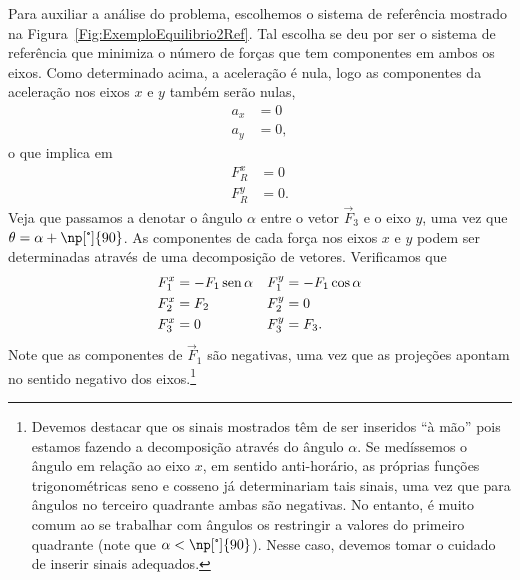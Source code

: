 Para auxiliar a análise do problema, escolhemos o sistema de referência mostrado na Figura~\ref{Fig:ExemploEquilibrio2Ref}. Tal escolha se deu por ser o sistema de referência que minimiza o número de forças que tem componentes em ambos os eixos. Como determinado acima, a aceleração é nula, logo as componentes da aceleração nos eixos $x$ e $y$ também serão nulas,
\begin{align}
    a_x &= 0 \\
    a_y &= 0,
\end{align}
%
o que implica em
\begin{align}
    F_R^x &= 0 \\
    F_R^y &= 0.
\end{align}
%
Veja que passamos a denotar o ângulo $\alpha$ entre o vetor $\vec{F}_3$ e o eixo $y$, uma vez que $\theta = \alpha + \np[\tcdegree]{90}$. As componentes de cada força nos eixos $x$ e $y$ podem ser determinadas através de uma decomposição de vetores. Verificamos que
\begin{align*}
    F_1^x &= -F_1\operatorname{sen}\alpha & F_1^y &= -F_1 \cos\alpha \\
    F_2^x &= F_2 & F_2^y &= 0 \\
    F_3^x &= 0 & F_3^y &= F_3.
\end{align*}
%
Note que as componentes de $\vec{F}_1$ são negativas, uma vez que as projeções apontam no sentido negativo dos eixos.\footnote[][-3cm]{Devemos destacar que os sinais mostrados têm de ser inseridos ``à mão'' pois estamos fazendo a decomposição através do ângulo $\alpha$. Se medíssemos o ângulo em relação ao eixo $x$, em sentido anti-horário, as próprias funções trigonométricas seno e cosseno já determinariam tais sinais, uma vez que para ângulos no terceiro quadrante ambas são negativas. No entanto, é muito comum ao se trabalhar com ângulos os restringir a valores do primeiro quadrante (note que $\alpha < \np[\tcdegree]{90}$). Nesse caso, devemos tomar o cuidado de inserir sinais adequados.}


